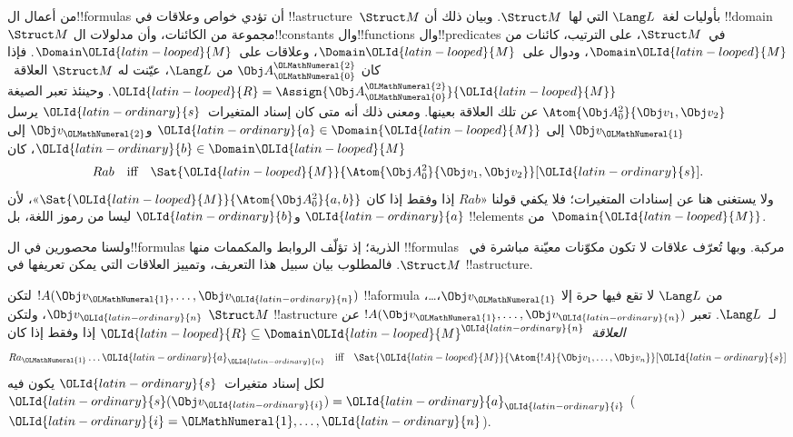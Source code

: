 \documentclass[../../../include/open-logic-section]{subfiles}
\begin{document}


\begin{explain}
من أعمال ال!!{formula}s أن تؤدي خواص وعلاقات في
!!a{structure}~$\Struct M$ بأوليات لغة~$\Lang L$
التي لها~$\Struct M$. وبيان ذلك أن !!{domain}~$\Struct M$
مجموعة من الكائنات، وأن مدلولات ال!!{constant}s وال!!{function}s
وال!!{predicate}s في~$\Struct M$، على الترتيب، كائنات من
$\Domain \OLId{latin-looped}{M}$، ودوال على~$\Domain \OLId{latin-looped}{M}$، وعلاقات على~$\Domain \OLId{latin-looped}{M}$.
فإذا كان $\Obj A^\OLMathNumeral{2}_\OLMathNumeral{0}$ من $\Lang L$، عيّنت له
$\Struct M$ العلاقة~$\OLId{latin-looped}{R} = \Assign{{\Obj
  A^\OLMathNumeral{2}_\OLMathNumeral{0}}}{\OLId{latin-looped}{M}}$. وحينئذ تعبر الصيغة $\Atom{\Obj A^2_0}{\Obj v_1, \Obj v_2}$
\emph{عن} تلك العلاقة بعينها. ومعنى ذلك أنه متى كان إسناد
المتغيرات~$\OLId{latin-ordinary}{s}$ يرسل $\Obj v_\OLMathNumeral{1}$ إلى $\OLId{latin-ordinary}{a} \in \Domain{\OLId{latin-looped}{M}}$ و$\Obj v_\OLMathNumeral{2}$
إلى $\OLId{latin-ordinary}{b} \in \Domain \OLId{latin-looped}{M}$، كان
\[
Rab \text{\quad iff\quad} \Sat{\OLId{latin-looped}{M}}{\Atom{\Obj A^2_0}{\Obj v_1, \Obj v_2}}[\OLId{latin-ordinary}{s}].
\]
ولا يستغنى هنا عن إسنادات المتغيرات؛ فلا يكفي قولنا
«$Rab$ إذا وفقط إذا كان $\Sat{\OLId{latin-looped}{M}}{\Atom{\Obj A^2_0}{a, b}}$»،
لأن $\OLId{latin-ordinary}{a}$ و$\OLId{latin-ordinary}{b}$ ليسا من رموز اللغة، بل !!{element}s
من~$\Domain{\OLId{latin-looped}{M}}$.

ولسنا محصورين في ال!!{formula}s الذرية؛ إذ تؤلّف الروابط
والمكممات منها !!{formula}s مركبة. وبها تُعرّف علاقات لا تكون
مكوّنات معيّنة مباشرة في~$\Struct M$. فالمطلوب بيان سبيل
هذا التعريف، وتمييز العلاقات التي يمكن تعريفها في !!a{structure}.
\end{explain}

\begin{defn}
لتكن $!A(\Obj v_\OLMathNumeral{1},\dots, \Obj v_\OLId{latin-ordinary}{n})$ !!a{formula} من $\Lang L$ لا
تقع فيها حرة إلا $\Obj v_\OLMathNumeral{1}$،\dots، $\Obj v_\OLId{latin-ordinary}{n}$، ولتكن $\Struct M$
!!a{structure} لـ~$\Lang L$. تعبر $!A(\Obj v_\OLMathNumeral{1},\dots, \Obj v_\OLId{latin-ordinary}{n})$
\emph{عن العلاقة}~$\OLId{latin-looped}{R} \subseteq \Domain \OLId{latin-looped}{M}^\OLId{latin-ordinary}{n}$ إذا وفقط إذا كان
\[
Ra_\OLMathNumeral{1}\dots \OLId{latin-ordinary}{a}_\OLId{latin-ordinary}{n} \text{\quad iff\quad} \Sat{\OLId{latin-looped}{M}}{\Atom{!A}{\Obj
    v_1,\dots, \Obj v_n}}[\OLId{latin-ordinary}{s}]
\]
لكل إسناد متغيرات~$\OLId{latin-ordinary}{s}$ يكون فيه $\OLId{latin-ordinary}{s}(\Obj v_\OLId{latin-ordinary}{i}) = \OLId{latin-ordinary}{a}_\OLId{latin-ordinary}{i}$ ($\OLId{latin-ordinary}{i} = \OLMathNumeral{1},
\dots, \OLId{latin-ordinary}{n}$).
\end{defn}
\end{document}
